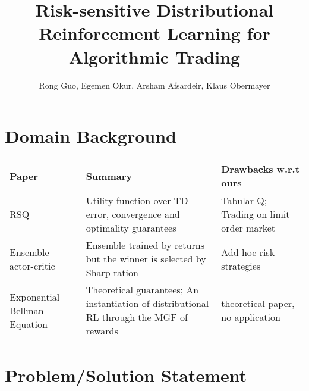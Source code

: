 

\title{Risk-sensitive Distributional Reinforcement Learning for Algorithmic Trading}
\author{Rong Guo, Egemen Okur, Arsham Afsardeir, Klaus Obermayer}



\maketitle

\listoftodos

\section{Domain Background}

\begin{center}
\begin{longtable}{| m{4cm} | m{5cm} | m{5cm} | }
\hline
\textbf{Paper} & \textbf{Summary} & \textbf{Drawbacks w.r.t ours}\\
\hline
\hline
RSQ \citep{shen_risk-sensitive_2014, shen_risk-averse_2014} & Utility function over TD error, convergence and optimality guarantees & Tabular Q; Trading on limit order market \\
\hline
Ensemble actor-critic \citep{yang_deep_2020} & Ensemble trained by returns but the winner is selected by Sharp ration & Add-hoc risk strategies\\
\hline
Exponential Bellman Equation \citep{fei_exponential_nodate} & Theoretical guarantees; An instantiation of distributional RL through the MGF of rewards & theoretical paper, no application \\
\hline
\end{longtable}
\end{center}


\section{Problem/Solution Statement}

~\\
~\\

